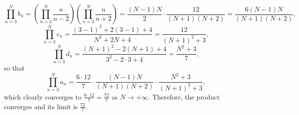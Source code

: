 \begin{solution}
    \[
        \prod_{n=3}^{N} b_n = \left(\prod_{n=3}^{N} \frac{n}{n-2}\right)\left(\prod_{n=3}^{N} \frac{n}{n+2}\right) = \frac{\left(N-1\right)N}{2} \cdot \frac{12}{\left(N+1\right)\left(N+2\right)} = \frac{6\left(N-1\right)N}{\left(N+1\right)\left(N+2\right)},
    \]
    \[
        \prod_{n=3}^{N} c_n = \frac{\left(3-1\right)^2+2\left(3-1\right)+4}{N^2+2N+4} = \frac{12}{\left(N+1\right)^2+3},
    \]
    \[
        \prod_{n=3}^{N} d_n = \frac{\left(N+1\right)^2-2\left(N+1\right)+4}{3^2-2 \cdot 3+4} = \frac{N^2+3}{7},
    \]
    so that
    \[
        \prod_{n=3}^{N} a_n = \frac{6 \cdot 12}{7} \cdot \frac{\left(N-1\right)N}{\left(N+1\right)\left(N+2\right)} \cdot \frac{N^2+3}{\left(N+1\right)^2+3},
    \]
    which clearly converges to \( \frac{6 \cdot 12}{7} = \frac{72}{7} \) as \( N \to +\infty \). Therefore, the product converges and its limit is \( \frac{72}{7} \).
\end{solution}
